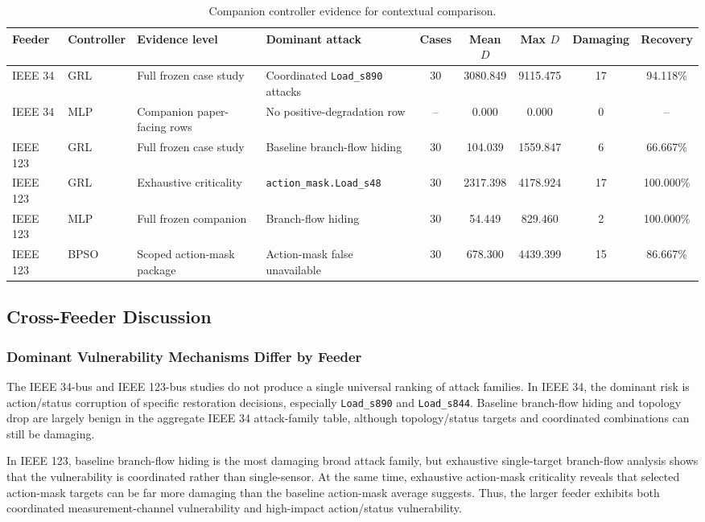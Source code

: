 \begin{table}[t]
\centering
\caption{Companion controller evidence for contextual comparison.}
\label{tab:companion_controller_evidence}
\scriptsize
\begin{tabular}{llllccccc}
\hline
Feeder & Controller & Evidence level & Dominant attack & Cases & Mean $D$ & Max $D$ & Damaging & Recovery \\
\hline
IEEE 34 & GRL & Full frozen case study & Coordinated \texttt{Load\_s890} attacks & 30 & 3080.849 & 9115.475 & 17 & 94.118\% \\
IEEE 34 & MLP & Companion paper-facing rows & No positive-degradation row & -- & 0.000 & 0.000 & 0 & -- \\
IEEE 123 & GRL & Full frozen case study & Baseline branch-flow hiding & 30 & 104.039 & 1559.847 & 6 & 66.667\% \\
IEEE 123 & GRL & Exhaustive criticality & \texttt{action\_mask.Load\_s48} & 30 & 2317.398 & 4178.924 & 17 & 100.000\% \\
IEEE 123 & MLP & Full frozen companion & Branch-flow hiding & 30 & 54.449 & 829.460 & 2 & 100.000\% \\
IEEE 123 & BPSO & Scoped action-mask package & Action-mask false unavailable & 30 & 678.300 & 4439.399 & 15 & 86.667\% \\
\hline
\end{tabular}
\end{table}

\subsection{Cross-Feeder Discussion}
\label{subsec:cross_feeder_discussion}

\subsubsection{Dominant Vulnerability Mechanisms Differ by Feeder}
\label{subsubsec:dominant_mechanisms}

The IEEE 34-bus and IEEE 123-bus studies do not produce a single universal ranking of attack families. In IEEE 34, the dominant risk is action/status corruption of specific restoration decisions, especially \texttt{Load\_s890} and \texttt{Load\_s844}. Baseline branch-flow hiding and topology drop are largely benign in the aggregate IEEE 34 attack-family table, although topology/status targets and coordinated combinations can still be damaging.

In IEEE 123, baseline branch-flow hiding is the most damaging broad attack family, but exhaustive single-target branch-flow analysis shows that the vulnerability is coordinated rather than single-sensor. At the same time, exhaustive action-mask criticality reveals that selected action-mask targets can be far more damaging than the baseline action-mask average suggests. Thus, the larger feeder exhibits both coordinated measurement-channel vulnerability and high-impact action/status vulnerability.

